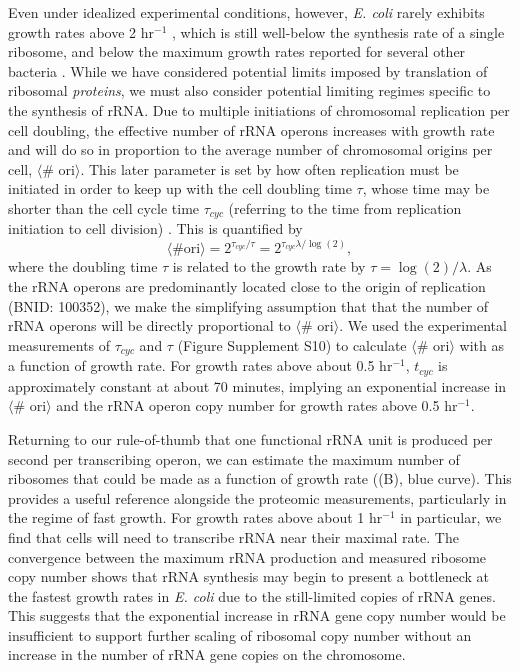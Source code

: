 Even under idealized experimental conditions, however, \textit{E. coli} rarely
exhibits growth rates above 2 hr$^{-1}$ \citep{bremer2008}, which is still
well-below the synthesis rate of a single ribosome, and below the maximum growth
rates reported for several other bacteria \citep{roller2016}. While we have
considered potential limits imposed by translation of ribosomal
\textit{proteins}, we must also consider potential limiting regimes specific to
the synthesis of rRNA. Due to multiple initiations of chromosomal replication
per cell doubling, the effective number of rRNA operons increases with growth
rate and will do so in proportion to the average number of chromosomal origins
per cell, $\langle$\# ori$\rangle$. This later parameter is set by how often
replication must be initiated in order to keep up with the cell doubling time
$\tau$, whose time may be shorter than the cell cycle time $\tau_{cyc}$
(referring to the time from replication initiation to cell division)
\citep{dennis2004, ho2015}. This is quantified by
\begin{equation}
    \langle \text{\# ori} \rangle = 2^{\tau_{cyc} / \tau} = 2^{\tau_{cyc} \lambda / \log(2)},
    \label{eq:Nori}
\end{equation}
where the doubling time $\tau$ is related to the growth rate by $\tau =
\log(2)/\lambda$. As the rRNA operons are predominantly located close to the
origin of replication (BNID: 100352), we make the simplifying assumption that
that the number of rRNA operons will be directly proportional to $\langle$\#
ori$\rangle$. We used the experimental measurements of $\tau_{cyc}$ and $\tau$
(Figure Supplement S10) to calculate $\langle$\# ori$\rangle$  with  as
a function of growth rate. For growth rates above about 0.5 hr$^{-1}$, $t_{cyc}$
is approximately constant at about 70 minutes, implying an exponential increase
in $\langle$\# ori$\rangle$ and the rRNA operon copy number for growth rates
above 0.5 hr$^{-1}$.

Returning to our rule-of-thumb that one functional rRNA unit is produced per
second per transcribing operon, we can estimate the maximum number of ribosomes
that could be made as a function of growth rate ((B), blue
curve). This provides a useful reference alongside the proteomic measurements,
particularly in the regime of fast growth. For growth rates above about 1
hr$^{-1}$ in particular, we find that cells will need to transcribe rRNA near
their maximal rate. The convergence between the maximum rRNA production and
measured ribosome copy number shows that rRNA synthesis may begin to present a
bottleneck at the fastest growth rates in \textit{E. coli} due to the
still-limited copies of rRNA genes. This suggests that the exponential increase
in rRNA gene copy number would be insufficient to support further scaling of
ribosomal copy number without an increase in the number of rRNA gene
copies on the chromosome.
